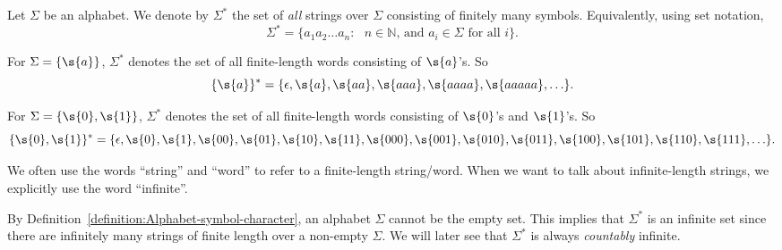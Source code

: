 \begin{flex}
\begin{definition} \label{definition:Star-operation-on-alphabets}
Let $\Sigma$ be an alphabet. 
We denote by $\Sigma^*$ the set of \emph{all} strings over $\Sigma$ consisting of finitely many symbols. 
Equivalently, using set notation,
\[
    \Sigma^* = \{a_1a_2\ldots a_n : \text{ $n \in \mathbb{N}$, and $a_i \in \Sigma$ for all $i$}\}.
\]
\end{definition}

\begin{example}[$\{a\}^*$] \label{example:a}
For $\Sigma = \{\s{a}\}$, $\Sigma^*$ denotes the set of all finite-length words consisting of $\s{a}$'s. 
So
\[
    \{\s{a}\}^* = \{\epsilon, \s{a}, \s{aa}, \s{aaa}, \s{aaaa}, \s{aaaaa}, \ldots \}.
\]
\end{example}

\begin{example}[$\{0,1\}^*$] \label{example:01}
For $\Sigma = \{\s{0},\s{1}\}$, $\Sigma^*$ denotes the set of all finite-length words consisting of $\s{0}$'s and $\s{1}$'s. 
So
\[
    \{\s{0},\s{1}\}^* = \{\epsilon, \s{0}, \s{1}, \s{00}, \s{01}, \s{10}, \s{11}, \s{000}, \s{001}, \s{010}, \s{011}, \s{100}, \s{101}, \s{110}, \s{111}, \ldots\}.
\]
\end{example}
\end{flex}

\begin{note} \label{note:Finite-vs-infinite-strings}
We often use the words ``string'' and ``word'' to refer to a finite-length string/word. 
When we want to talk about infinite-length strings, we explicitly use the word ``infinite''.
\end{note}

\begin{note} \label{note:Size-of-Sigma}
By Definition~\ref{definition:Alphabet-symbol-character}, an alphabet $\Sigma$ cannot be the empty set. 
This implies that $\Sigma^*$ is an infinite set since there are infinitely many strings of finite length over a non-empty $\Sigma$. We will later see that $\Sigma^*$ is always \emph{countably} infinite.
\end{note}

